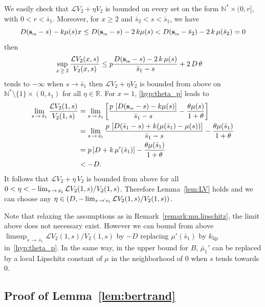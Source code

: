 \documentclass[10pt]{amsart}
\theoremstyle{definition}\newtheorem{defi}[theo]{Definition}\newtheorem{rema}[theo]{Remark}\newtheorem{exam}[theo]{Example}\newtheorem{exem}[theo]{Example}\newtheorem{nota}[theo]{Notation}
\newcommand{\RR}{\mathbb{R}}
\newcommand{\NN}{\mathbb{N}}
\newcommand{\clL}{\mathcal{L}}
\newcommand{\Sin}{{\mathbf s}_{\textrm{\tiny\rm in}}}
\newcommand{\klip}{k_{\text{lip}}}
\newcommand{\1}{\mathbf{1}}
\begin{document}
We easily check that $\clL V_2 + \eta V_2$ is bounded on every set on the form $\NN^* \times (0,r]$, with $0<r<\bar s_1$. Moreover, for $x\geq 2$ and $\bar s_2<s<\bar s_1$, we have
\[
D(\Sin - s)- k \mu(s) x \leq D(\Sin - s)- 2\,k \mu(s) < D(\Sin -\bar{s}_2)- 2\,k\,\mu(\bar{s}_2)=0
\]
then
\begin{align*}
\sup_{x\,\geq\,2}\frac{\clL V_2(x,s)}{V_2(x,s)} &\leq p \frac{D(\Sin - s)- 2\,k\,\mu(s) }{\bar{s}_1-s} + 2\,D\,\theta
\end{align*}
tends to $-\infty$ when $s\to \bar{s}_1$ then $\clL V_2 + \eta V_2$ is bounded from above on $\NN^*\setminus\{1\} \times (0,\bar s_1)$ for all $\eta\in\RR$. For $x =1$, \eqref{hyp:theta_p} leads to
\begin{align*}
\lim_{s\,\to\,\bar{s}_1} \frac{\clL V_2(1,s)}{V_2(1,s)} &= \lim_{s\,\to\,\bar{s}_1} \left[\frac{p\, \left[D(\Sin - s)- k \mu(s)\right]}{\bar{s}_1-s} - \frac{\theta \mu(s)}{1+\theta}\right]\\
&= \lim_{s\,\to\,\bar{s}_1} \frac{p\, \left[D(\bar s_1 - s)+ k (\mu(\bar s_1)-\mu(s))\right]}{\bar{s}_1-s} - \frac{\theta \mu(\bar s_1)}{1+\theta}\\
& = p\left[D+ k \,\mu'(\bar s_1)\right]- \frac{\theta \mu(\bar s_1)}{1+\theta}\\
& <-D.
\end{align*}
It follows that $\clL V_2 + \eta\,V_2$ is bounded from above for all $0<\eta<-\lim_{s \,\to\,\bar s_1} \clL V_2(1,s)/\linebreak V_2(1,s)$. Therefore Lemma~\ref{lem:LV} holds and we can choose any $\eta\in (D, -\lim_{s\,\to \bar\,s_1}\linebreak \clL V_2(1,s)/V_2(1,s))$.

Note that relaxing the assumptions as in Remark~\ref{remark:mu.lipschitz}, the limit above does not necessary exist. However we can bound from above $\limsup_{s\,\to\,\bar s_1} \clL V_2(1,s)/V_2(1,s)$ by $-D$ replacing $\mu'(\bar s_1)$ by $\klip$ in~\eqref{hyp:theta_p}. In the same way, in the upper bound for $B$, $\bar \mu_1'$ can be replaced by a local Lipschitz constant of $\mu$ in the neighborhood of 0 when $s$ tends towards 0.



\subsection{Proof of Lemma~\ref{lem:bertrand}}\label{sec:lem.bertrand}
\end{document}
